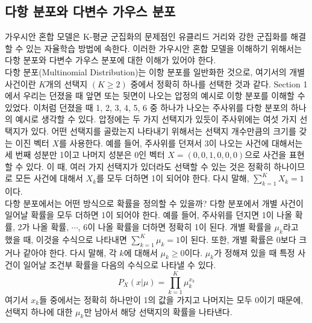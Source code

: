 \documentclass[a4paper]{oblivoir}
\begin{document}
\subsection{다항 분포와 다변수 가우스 분포}

가우시안 혼합 모델은 K-평균 군집화의 문제점인 유클리드 거리와 강한 군집화를 해결할 수 있는 자율학습 방법에 속한다. 이러한 가우시안 혼합 모델을 이해하기 위해서는 다항 분포와 다변수 가우스 분포에 대한 이해가 있어야 한다. \\

다항 분포(Multinomial Distribution)는 이항 분포를 일반화한 것으로, 여기서의 개별 사건이란 $K$개의 선택지 $(K \geq 2)$ 중에서 정확히 하나를 선택한 것과 같다. Section 1에서 우리는 던졌을 때 앞면 또는 뒷면이 나오는 압정의 예시로 이항 분포를 이해할 수 있었다. 이처럼 던졌을 때 1, 2, 3, 4, 5, 6 중 하나가 나오는 주사위를 다항 분포의 하나의 예시로 생각할 수 있다. 압정에는 두 가지 선택지가 있듯이 주사위에는 여섯 가지 선택지가 있다. 어떤 선택지를 골랐는지 나타내기 위해서는 선택지 개수만큼의 크기를 갖는 이진 벡터 $X$를 사용한다. 예를 들어, 주사위를 던져서 3이 나오는 사건에 대해서는 세 번째 성분만 1이고 나머지 성분은 0인 벡터 $X=(0,0,1,0,0,0)$으로 사건을 표현할 수 있다. 이 때, 여러 가지 선택지가 있더라도 선택할 수 있는 것은 정확히 하나이므로 모든 사건에 대해서 $X_k$를 모두 더하면 1이 되어야 한다. 다시 말해, $\sum_{k=1}^{K} X_k = 1$이다. \\

다항 분포에서는 어떤 방식으로 확률을 정의할 수 있을까? 다항 분포에서 개별 사건이 일어날 확률을 모두 더하면 1이 되어야 한다. 예를 들어, 주사위를 던지면 1이 나올 확률, 2가 나올 확률, $\cdots$, 6이 나올 확률을 더하면 정확히 1이 된다. 개별 확률을 $\mu_k$라고 했을 때, 이것을 수식으로 나타내면 $\sum_{k=1}^{K} \mu_k = 1$이 된다. 또한, 개별 확률은 0보다 크거나 같아야 한다. 다시 말해, 각 $k$에 대해서 $\mu_k \geq 0$이다. $\mu_k$가 정해져 있을 때 특정 사건이 일어날 조건부 확률을 다음의 수식으로 나타낼 수 있다.  
\begin{equation}
P_{X}(x|\mu) = \prod_{k=1}^{K} \mu_{k}^{x_k}
\label{eq:8-4}
\end{equation}
여기서 $x_k$들 중에서는 정확히 하나만이 1의 값을 가지고 나머지는 모두 0이기 때문에, 선택지 하나에 대한 $\mu_{k}$만 남아서 해당 선택지의 확률을 나타낸다. \\
\end{document}
